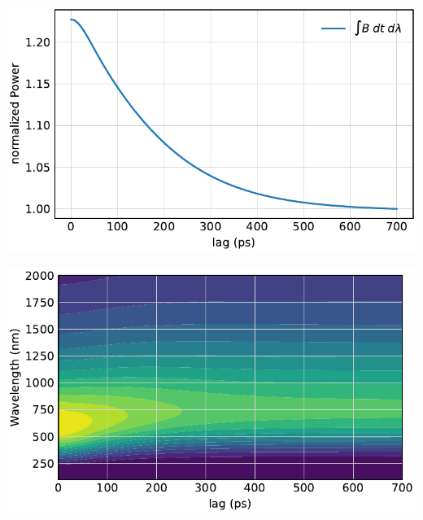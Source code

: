 \begin{frame}
	\centering
	\includegraphics{../model/figures/autocorrelation.pdf}
\end{frame}

\begin{frame}
	\centering
	\includegraphics{../model/figures/autocorrelation spectrum.pdf}
\end{frame}

